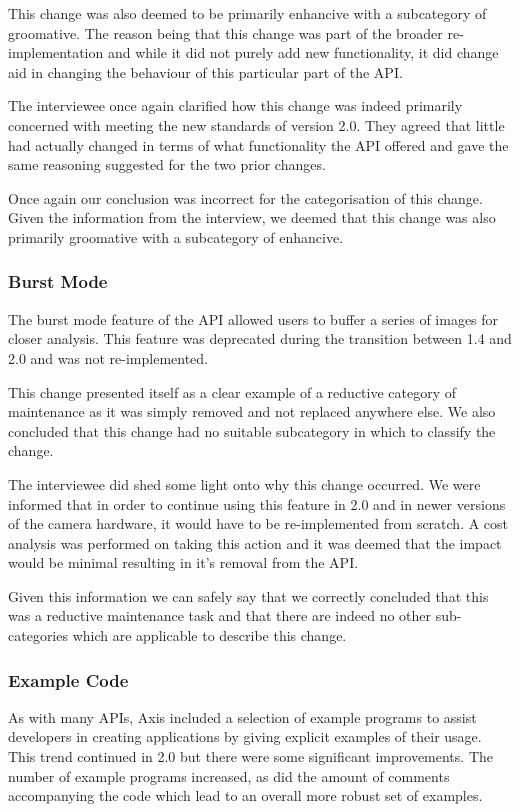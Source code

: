 \documentclass{sig-alternate}
\begin{document}
This change was also deemed to be primarily enhancive with a subcategory of groomative. The reason being that this change was part of the broader re-implementation and while it did not purely add new functionality, it did change aid in changing the behaviour of this particular part of the API.

The interviewee once again clarified how this change was indeed primarily concerned with meeting the new standards of version 2.0. They agreed that little had actually changed in terms of what functionality the API offered and gave the same reasoning suggested for the two prior changes.

Once again our conclusion was incorrect for the categorisation of this change. Given the information from the interview, we deemed that this change was also primarily groomative with a subcategory of enhancive.


\subsubsection{Burst Mode}

The burst mode feature of the API allowed users to buffer a series of images for closer analysis. This feature was deprecated during the transition between 1.4 and 2.0 and was not re-implemented.

This change presented itself as a clear example of a reductive category of maintenance as it was simply removed and not replaced anywhere else. We also concluded that this change had no suitable subcategory in which to classify the change.

The interviewee did shed some light onto why this change occurred. We were informed that in order to continue using this feature in 2.0 and in newer versions of the camera hardware, it would have to be re-implemented from scratch. A cost analysis was performed on taking this action and it was deemed that the impact would be minimal resulting in it's removal from the API.

Given this information we can safely say that we correctly concluded that this was a reductive maintenance task and that there are indeed no other sub-categories which are applicable to describe this change.


\subsubsection{Example Code}

As with many APIs, Axis included a selection of example programs to assist developers in creating applications by giving explicit examples of their usage. This trend continued in 2.0 but there were some significant improvements. The number of example programs increased, as did the amount of comments accompanying the code which lead to an overall more robust set of examples.
\end{document}
